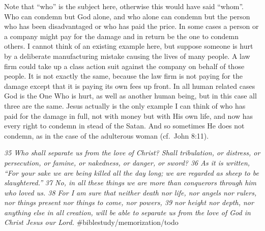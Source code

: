 Note that ``who'' is the subject here, otherwise this would have said
``whom''. Who can condemn but God alone, and who alone can condemn but
the person who has been disadvantaged or who has paid the price. In some
cases a person or a company might pay for the damage and in return be
the one to condemn others. I cannot think of an existing example here,
but suppose someone is hurt by a deliberate manufacturing mistake
causing the lives of many people. A law firm could take up a class
action suit against the company on behalf of those people. It is not
exactly the same, because the law firm is not paying for the damage
except that it is paying its own fees up front. In all human related
cases God is the One Who is hurt, as well as another human being, but in
this case all three are the same. Jesus actually is the only example I
can think of who has paid for the damage in full, not with money but
with His own life, and now has every right to condemn in stead of the
Satan. And so sometimes He does not condemn, as in the case of the
adulterous woman (cf.~John 8:11).

\emph{35 Who shall separate us from the love of Christ? Shall
tribulation, or distress, or persecution, or famine, or nakedness, or
danger, or sword? 36 As it is written,} \emph{``For your sake we are
being killed all the day long; we are regarded as sheep to be
slaughtered.''} \emph{37 No, in all these things we are more than
conquerors through him who loved us. 38 For I am sure that neither
death nor life, nor angels nor rulers, nor things present nor things to
come, nor powers, 39 nor height nor depth, nor anything else in all
creation, will be able to separate us from the love of God in Christ
Jesus our Lord.} \#biblestudy/memorization/todo

